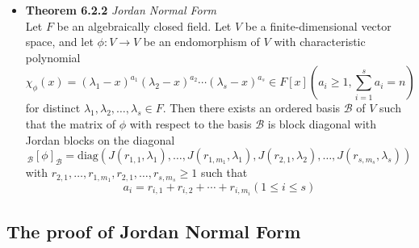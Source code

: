 \documentclass[11pt,a4paper]{article}
\begin{document}
\begin{itemize}
    \item \textbf{Theorem 6.2.2} \emph{Jordan Normal Form} \\
        Let $F$ be an algebraically closed field.
        Let $V$ be a finite-dimensional vector space,
        and let $\phi : V \to V$ be an endomorphism of $V$ with characteristic polynomial
        \[
            \chi_\phi (x) = {(\lambda_1 - x)}^{a_1} {(\lambda_2 - x)}^{a_2} \cdots
            {(\lambda_s - x)}^{a_s} \in F[x] (a_i \geq 1, \sum_{i=1}^s a_i = n)
        \]
        for distinct $\lambda_1, \lambda_2, \ldots, \lambda_s \in F$.
        Then there exists an ordered basis $\mathcal{B}$ of $V$ such that the matrix of
        $\phi$ with respect to the basis $\mathcal{B}$ is block diagonal with Jordan
        blocks on the diagonal
        \[
            _\mathcal{B} {[\phi]}_\mathcal{B} =
            \mathrm{diag}(J(r_{1,1}, \lambda_1), \ldots,
            J(r_{1,m_1}, \lambda_1), J(r_{2,1}, \lambda_2), \ldots, J(r_{s,m_s}, \lambda_s))
        \]
        with $r_{2,1}, \ldots, r_{1,m_1}, r_{2,1}, \ldots, r_{s, m_s} \geq 1$ such that
        \[
            a_i = r_{i,1} + r_{i,2} + \cdots + r_{i, m_i} (1 \leq i \leq s)
        \]
\end{itemize}

\subsection{The proof of Jordan Normal Form}
\end{document}
